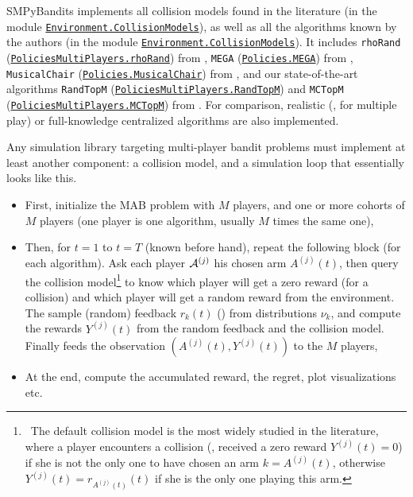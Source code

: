 SMPyBandits implements all collision models found in the literature (in the module \texttt{\href{https://SMPyBandits.GitHub.io/docs/Environment.CollisionModels.html}{Environment.CollisionModels}}), as well as all the algorithms known by the authors (in the module \texttt{\href{https://SMPyBandits.GitHub.io/docs/Environment.CollisionModels.html}{Environment.CollisionModels}}).
%
It includes
\texttt{rhoRand} (\texttt{\href{https://SMPyBandits.GitHub.io/docs/PoliciesMultiPlayers.rhoRand.html}{PoliciesMultiPlayers.rhoRand}}) from \cite{Anandkumar11},
\texttt{MEGA} (\texttt{\href{https://SMPyBandits.GitHub.io/docs/Policies.MEGA.html}{Policies.MEGA}}) from \cite{Avner15},
\texttt{MusicalChair} (\texttt{\href{https://SMPyBandits.GitHub.io/docs/Policies.MusicalChair.html}{Policies.MusicalChair}}) from \cite{Rosenski16},
and our state-of-the-art algorithms
\texttt{RandTopM} (\texttt{\href{https://SMPyBandits.GitHub.io/docs/PoliciesMultiPlayers.RandTopM.html}{PoliciesMultiPlayers.RandTopM}}) and
\texttt{MCTopM} (\texttt{\href{https://SMPyBandits.GitHub.io/docs/PoliciesMultiPlayers.MCTopM.html}{PoliciesMultiPlayers.MCTopM}}) from \cite{Besson2018ALT}.
For comparison, realistic (\eg, \UCB{} for multiple play) or full-knowledge centralized algorithms are also implemented.

Any simulation library targeting multi-player bandit problems must implement at least another component:
a collision model, and a simulation loop that essentially looks like this.
\begin{itemize}
    \item First, initialize the MAB problem with $M$ players, and one or more cohorts of $M$ players (one player is one algorithm, usually $M$ times the same one),
    \item Then, for $t=1$ to $t=T$ (known before hand), repeat the following block (for each algorithm). Ask each player $\mathcal{A}^{(j)}$ his chosen arm $A^{(j)}(t)$, then query the collision model\footnote{~The default collision model is the most widely studied in the literature, where a player encounters a collision (\ie, received a zero reward $Y^{(j)}(t)=0$) if she is not the only one to have chosen an arm $k=A^{(j)}(t)$, otherwise $Y^{(j)}(t)=r_{A^{(j)}(t)}(t)$ if she is the only one playing this arm.} to know which player will get a zero reward (for a collision) and which player will get a random reward from the environment. The
    sample (random) feedback $r_k(t)$ (\iid) from distributions $\nu_{k}$, and compute the rewards $Y^{(j)}(t)$ from the random feedback and the collision model. Finally feeds the observation $(A^{(j)}(t),Y^{(j)}(t))$ to the $M$ players,
    \item At the end, compute the accumulated reward, the regret, plot visualizations etc.
\end{itemize}


